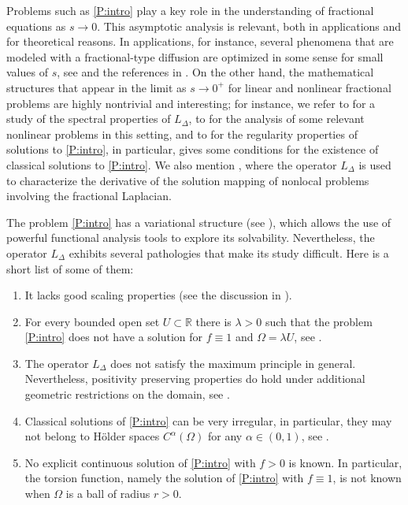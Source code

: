 \documentclass[11 pt]{article}
\numberwithin{equation}{section}
\def\R{\mathbb{R}}
\begin{document}
 Problems such as \eqref{P:intro} play a key role in the understanding of fractional equations as $s\to 0$. This asymptotic analysis is relevant, both in applications and for theoretical reasons.  In applications, for instance, several phenomena that are modeled with a fractional-type diffusion are optimized in some sense for small values of $s$, see \cite{Caffarelli17} and the references in \cite{HSS22}.  On the other hand,  the mathematical structures that appear in the limit as $s\to 0^+$ for linear and nonlinear fractional problems are highly nontrivial and interesting; for instance, we refer to \cite{CW19,LW21} for a study of the spectral properties of $L_\Delta$, to \cite{AS22,HSS22} for the analysis of some relevant nonlinear problems in this setting, and to \cite{CS22} for the regularity properties of solutions to \eqref{P:intro}, in particular, \cite[Theorem 1.1]{CS22} gives some conditions for the existence of classical solutions to \eqref{P:intro}.  We also mention \cite{JSW20}, where the operator $L_\Delta$ is used to characterize the derivative of the solution mapping of nonlocal problems involving the fractional Laplacian.

The problem \eqref{P:intro} has a variational structure (see \cite{CW19}), which allows the use of powerful functional analysis tools to explore its solvability. Nevertheless, the operator $L_\Delta$ exhibits several pathologies that make its study difficult. Here is a short list of some of them:
\begin{enumerate}
    \item It lacks good scaling properties (see the discussion in \cite{CS22}).
    \item For every bounded open set $U\subset \R$ there is $\lambda>0$ such that the problem \eqref{P:intro} does not have a solution for $f\equiv 1$ and $\Omega=\lambda U$, see \cite[Remark 5.9]{CS22}.
    \item The operator $L_\Delta$ does not satisfy the maximum principle in general. Nevertheless, positivity preserving properties do hold under additional geometric restrictions on the domain, see \cite[Theorem 1.8 and Corollary 1.9]{CW19}.
    \item Classical solutions of \eqref{P:intro} can be very irregular, in particular, they may not belong to Hölder spaces $C^\alpha(\Omega)$ for any $\alpha\in(0,1)$, see \cite[Remark 5.6]{CS22}.
    \item No explicit continuous solution of \eqref{P:intro} with $f>0$ is known. In particular, the torsion function, namely the solution of \eqref{P:intro} with $f\equiv 1$, is not known when $\Omega$ is a ball of radius $r>0$.
\end{enumerate}
\end{document}
